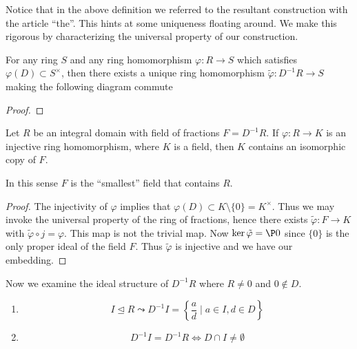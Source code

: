 \documentclass[master.tex]{subfiles}
\begin{document}
  Notice that in the above definition we referred to the resultant construction with the article ``the''. This hints at
  some uniqueness floating around. We make this rigorous by characterizing the universal property of our construction.
  \begin{prop}
    For any ring \(S\) and any ring homomorphism \(\varphi \colon R \to S\) which satisfies
    \(\varphi(D) \subset S^\times\), then there exists a unique ring homomorphism
    \(\tilde{\varphi} \colon D^{-1}R \to S\) making the following diagram commute
    \begin{figure}[h]
      \centering
    \end{figure}
  \end{prop}
  \begin{proof}
    
  \end{proof}
  \begin{prop}
    Let \(R\) be an integral domain with field of fractions \(F=D^{-1}R\). If \(\varphi \colon R \to K\) is an injective
    ring homomorphism, where \(K\) is a field, then \(K\) contains an isomorphic copy of \(F\).
  \end{prop}
  In this sense \(F\) is the ``smallest'' field that contains \(R\).
  \begin{proof}
    The injectivity of \(\varphi\) implies that \(\varphi(D) \subset K \setminus \{0\} = K^\times\). Thus we may invoke
    the universal property of the ring of fractions, hence there exists \(\tilde{\varphi} \colon F \to K\) with
    \(\tilde{\varphi} \circ j = \varphi\). This map is not the trivial map. Now \(\ker \tilde{\varphi} = \P0\) since
    \(\{0\}\) is the only proper ideal of the field \(F\). Thus \(\tilde{\varphi}\) is injective and we have our
    embedding.
  \end{proof}
  Now we examine the ideal structure of \(D^{-1}R\) where \(R \neq 0\) and \(0 \not \in D\).
  \begin{rmk} \mbox{}
    \begin{enumerate}[label=(\alph*)]
    \item \[I \unlhd R \leadsto D^{-1}I = \left\{\frac{a}{d} \mid a \in I, d \in D\right\}\]
    \item \[D^{-1}I = D^{-1}R \iff D \cap I \neq \emptyset\]
    \end{enumerate}
  \end{rmk}
\end{document}
